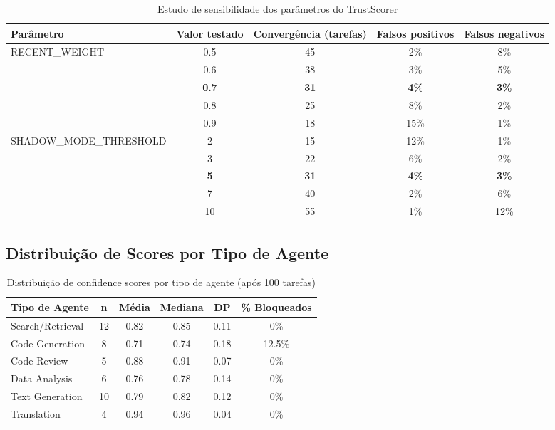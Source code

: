 \begin{table}[htbp]
\centering
\caption{Estudo de sensibilidade dos parâmetros do TrustScorer}
\label{tab:sensitivity}
\begin{tabular}{@{}p{3cm}cccc@{}}
\toprule
\textbf{Parâmetro} & \textbf{Valor testado} & \textbf{Convergência (tarefas)} & \textbf{Falsos positivos} & \textbf{Falsos negativos} \\
\midrule
\multirow{5}{*}{RECENT\_WEIGHT} & 0.5 & 45 & 2\% & 8\% \\
& 0.6 & 38 & 3\% & 5\% \\
& \textbf{0.7} & \textbf{31} & \textbf{4\%} & \textbf{3\%} \\
& 0.8 & 25 & 8\% & 2\% \\
& 0.9 & 18 & 15\% & 1\% \\
\midrule
\multirow{5}{*}{SHADOW\_MODE\_THRESHOLD} & 2 & 15 & 12\% & 1\% \\
& 3 & 22 & 6\% & 2\% \\
& \textbf{5} & \textbf{31} & \textbf{4\%} & \textbf{3\%} \\
& 7 & 40 & 2\% & 6\% \\
& 10 & 55 & 1\% & 12\% \\
\bottomrule
\end{tabular}
\end{table}

\subsection{Distribuição de Scores por Tipo de Agente}

\begin{table}[htbp]
\centering
\caption{Distribuição de confidence scores por tipo de agente (após 100 tarefas)}
\label{tab:score-distribution}
\begin{tabular}{@{}p{3.5cm}ccccc@{}}
\toprule
\textbf{Tipo de Agente} & \textbf{n} & \textbf{Média} & \textbf{Mediana} & \textbf{DP} & \textbf{\% Bloqueados} \\
\midrule
Search/Retrieval & 12 & 0.82 & 0.85 & 0.11 & 0\% \\
Code Generation & 8 & 0.71 & 0.74 & 0.18 & 12.5\% \\
Code Review & 5 & 0.88 & 0.91 & 0.07 & 0\% \\
Data Analysis & 6 & 0.76 & 0.78 & 0.14 & 0\% \\
Text Generation & 10 & 0.79 & 0.82 & 0.12 & 0\% \\
Translation & 4 & 0.94 & 0.96 & 0.04 & 0\% \\
\bottomrule
\end{tabular}
\end{table}

